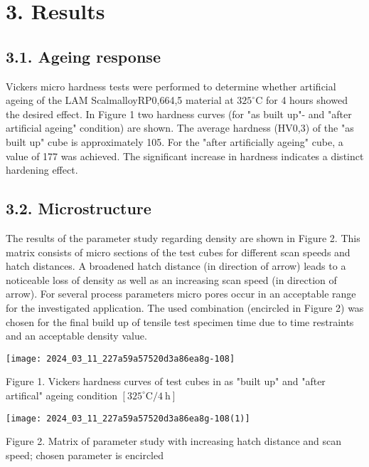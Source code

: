 \documentclass[10pt]{article}
\begin{document}
\section*{3. Results}
\subsection*{3.1. Ageing response}
Vickers micro hardness tests were performed to determine whether artificial ageing of the LAM ScalmalloyRP0,664,5 material at $325^{\circ} \mathrm{C}$ for 4 hours showed the desired effect. In Figure 1 two hardness curves (for "as built up"- and "after artificial ageing" condition) are shown. The average hardness (HV0,3) of the "as built up" cube is approximately 105. For the "after artificially ageing" cube, a value of 177 was achieved. The significant increase in hardness indicates a distinct hardening effect.

\subsection*{3.2. Microstructure}
The results of the parameter study regarding density are shown in Figure 2. This matrix consists of micro sections of the test cubes for different scan speeds and hatch distances. A broadened hatch distance (in direction of arrow) leads to a noticeable loss of density as well as an increasing scan speed (in direction of arrow). For several process parameters micro pores occur in an acceptable range for the investigated application. The used combination (encircled in Figure 2) was chosen for the final build up of tensile test specimen time due to time restraints and an acceptable density value.

\begin{center}
\texttt{[image: 2024\_03\_11\_227a59a57520d3a86ea8g-108]}
\end{center}

Figure 1. Vickers hardness curves of test cubes in as "built up" and "after artifical" ageing condition $\left[325^{\circ} \mathrm{C} / 4 \mathrm{~h}\right]$

\begin{center}
\texttt{[image: 2024\_03\_11\_227a59a57520d3a86ea8g-108(1)]}
\end{center}

Figure 2. Matrix of parameter study with increasing hatch distance and scan speed; chosen parameter is encircled
\end{document}
